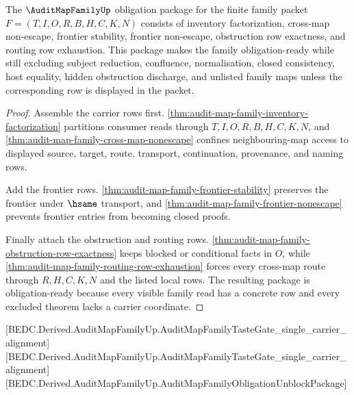 \begin{theorem}
\label{thm:audit-map-family-obligation-unblock-package}
The $\AuditMapFamilyUp$ obligation package for the finite family packet $F=(T,I,O,R,B,H,C,K,N)$ consists of inventory factorization, cross-map non-escape, frontier stability, frontier non-escape, obstruction row exactness, and routing row exhaustion. This package makes the family obligation-ready while still excluding subject reduction, confluence, normalisation, closed consistency, host equality, hidden obstruction discharge, and unlisted family maps unless the corresponding row is displayed in the packet.
\end{theorem}
\begin{proof}
Assemble the carrier rows first. \autoref{thm:audit-map-family-inventory-factorization} partitions consumer reads through $T,I,O,R,B,H,C,K,N$, and \autoref{thm:audit-map-family-cross-map-nonescape} confines neighbouring-map access to displayed source, target, route, transport, continuation, provenance, and naming rows.

Add the frontier rows. \autoref{thm:audit-map-family-frontier-stability} preserves the frontier under $\hsame$ transport, and \autoref{thm:audit-map-family-frontier-nonescape} prevents frontier entries from becoming closed proofs.

Finally attach the obstruction and routing rows. \autoref{thm:audit-map-family-obstruction-row-exactness} keeps blocked or conditional facts in $O$, while \autoref{thm:audit-map-family-routing-row-exhaustion} forces every cross-map route through $R,H,C,K,N$ and the listed local rows. The resulting package is obligation-ready because every visible family read has a concrete row and every excluded theorem lacks a carrier coordinate.
\end{proof}

[BEDC.Derived.AuditMapFamilyUp.AuditMapFamilyTasteGate\_single\_carrier\_alignment]
[BEDC.Derived.AuditMapFamilyUp.AuditMapFamilyTasteGate\_single\_carrier\_alignment]
[BEDC.Derived.AuditMapFamilyUp.AuditMapFamilyObligationUnblockPackage]


